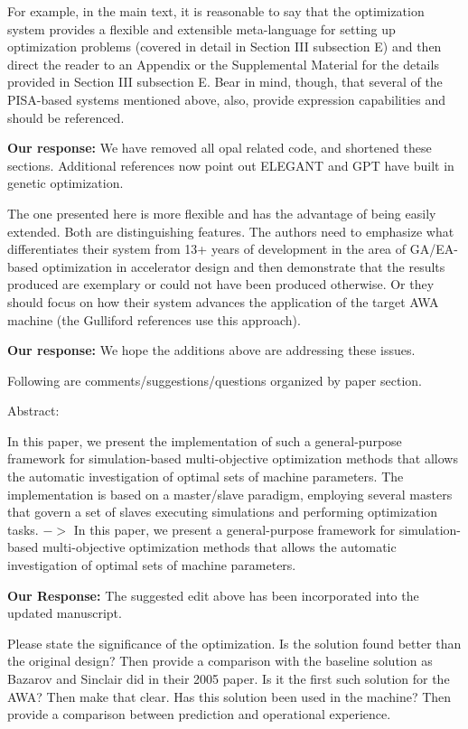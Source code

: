\documentclass{article}
\begin{document}
For example, in the main text, it is
reasonable to say that the optimization system provides a flexible and
extensible meta-language for setting up optimization problems (covered
in detail in Section III subsection E) and then direct the reader to
an Appendix or the Supplemental Material for the details provided in
Section III subsection E. Bear in mind, though, that several of the
PISA-based systems mentioned above, also, provide expression
capabilities and should be referenced. 

{\bf Our response: }{\color{blue} We have removed all opal related code, and shortened these sections.
	Additional references now point out ELEGANT and GPT have built in genetic optimization.}

The one presented here is more
flexible and has the advantage of being easily extended. Both are
distinguishing features. The authors need to emphasize what
differentiates their system from 13+ years of development in the area
of GA/EA-based optimization in accelerator design and then demonstrate
that the results produced are exemplary or could not have been
produced otherwise. Or they should focus on how their system advances
the application of the target AWA machine (the Gulliford references
use this approach).

{\bf Our response: }{\color{blue} 	
	We hope the additions above are addressing these issues. }

Following are comments/suggestions/questions organized by paper
section.

Abstract:

In this paper, we present the implementation of such a general-purpose
framework for simulation-based multi-objective optimization methods
that allows the automatic investigation of optimal sets of machine
parameters. The implementation is based on a master/slave paradigm,
employing several masters that govern a set of slaves executing
simulations and performing optimization tasks. $->$ In this paper, we
present a general-purpose framework for simulation-based
multi-objective optimization methods that allows the automatic
investigation of optimal sets of machine parameters.

{\bf Our Response:} {\color{blue} The suggested edit above has been incorporated into the updated manuscript. }

Please state
the significance of the optimization. Is the solution found better
than the original design? Then provide a comparison with the baseline
solution as Bazarov and Sinclair did in their 2005 paper. Is it the
first such solution for the AWA? Then make that clear. Has this
solution been used in the machine? Then provide a comparison between
prediction and operational experience.
\end{document}
